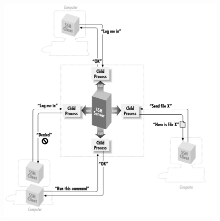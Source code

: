 \documentclass[xcolor=dvipsnames, aspectratio=169]{beamer}
\begin{document}
\begin{frame}
\begin{figure}
\center
\includegraphics[scale=0.25]{ssh2}
\end{figure}
\end{frame}
\end{document}
